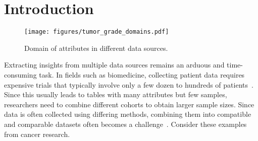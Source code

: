 \section{Introduction}
\label{sec:intro}

\begin{figure}[t]
    \centering
    \texttt{[image: figures/tumor\_grade\_domains.pdf]}
    \caption{Domain of attributes in different data sources.}
    \label{fig:tumor_grade_domains}
\end{figure}


Extracting insights from multiple data sources remains an arduous and time-consuming task.
In fields such as biomedicine, collecting patient data requires expensive trials that typically involve only a few dozen to hundreds of patients~\cite{li2023proteogenomic}. Since this usually leads to tables with many attributes but few samples, researchers need to combine 
different cohorts to obtain larger sample sizes. %
Since data is often collected 
using differing methods,
combining them into compatible and comparable datasets often becomes a 
challenge~\cite{cheng2024general}. %
Consider these examples from cancer research.

